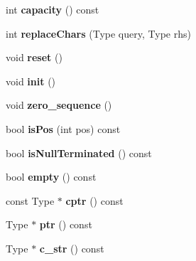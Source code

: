 \begin{DoxyCompactItemize}
\item 
\hypertarget{classps_1_1CTString_aa493337526c1a83adbbb990af30998c3}{}int {\bfseries capacity} () const \label{classps_1_1CTString_aa493337526c1a83adbbb990af30998c3}

\item 
\hypertarget{classps_1_1CTString_a62c205455a9c755167e089f33c622f26}{}int {\bfseries replace\+Chars} (Type query, Type rhs)\label{classps_1_1CTString_a62c205455a9c755167e089f33c622f26}

\item 
\hypertarget{classps_1_1CTString_af31147bb50cce268d4c1b97ea42e7606}{}void {\bfseries reset} ()\label{classps_1_1CTString_af31147bb50cce268d4c1b97ea42e7606}

\item 
\hypertarget{classps_1_1CTString_a038196daac766aab63826c0a43712176}{}void {\bfseries init} ()\label{classps_1_1CTString_a038196daac766aab63826c0a43712176}

\item 
\hypertarget{classps_1_1CTString_a951e63cbd185f18c67c575e6a8fed779}{}void {\bfseries zero\+\_\+sequence} ()\label{classps_1_1CTString_a951e63cbd185f18c67c575e6a8fed779}

\item 
\hypertarget{classps_1_1CTString_aeb6a209091b071c578592a57a1203463}{}bool {\bfseries is\+Pos} (int pos) const \label{classps_1_1CTString_aeb6a209091b071c578592a57a1203463}

\item 
\hypertarget{classps_1_1CTString_a63f8a1261cacfe0de9bc6749bac34de0}{}bool {\bfseries is\+Null\+Terminated} () const \label{classps_1_1CTString_a63f8a1261cacfe0de9bc6749bac34de0}

\item 
\hypertarget{classps_1_1CTString_a6ac27617451f2ae8c1bc657a72e09dd9}{}bool {\bfseries empty} () const \label{classps_1_1CTString_a6ac27617451f2ae8c1bc657a72e09dd9}

\item 
\hypertarget{classps_1_1CTString_ab7e0ed0806dd30d5435498d2c5160969}{}const Type $\ast$ {\bfseries cptr} () const \label{classps_1_1CTString_ab7e0ed0806dd30d5435498d2c5160969}

\item 
\hypertarget{classps_1_1CTString_a43043d03b04334bd1d09519782a3a5c1}{}Type $\ast$ {\bfseries ptr} () const \label{classps_1_1CTString_a43043d03b04334bd1d09519782a3a5c1}

\item 
\hypertarget{classps_1_1CTString_a33579a26762a74e84406976ad663bf46}{}Type $\ast$ {\bfseries c\+\_\+str} () const \label{classps_1_1CTString_a33579a26762a74e84406976ad663bf46}


\end{DoxyCompactItemize}
